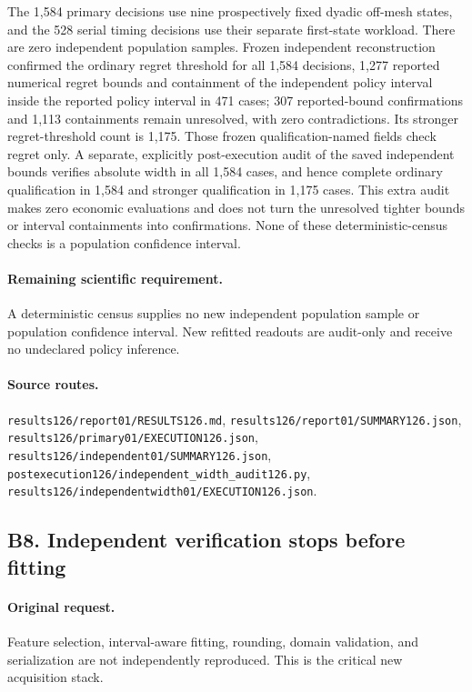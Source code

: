 The 1,584 primary decisions use nine prospectively fixed dyadic off-mesh states, and the 528 serial timing decisions use their separate first-state workload. There are zero independent population samples. Frozen independent reconstruction confirmed the ordinary regret threshold for all 1,584 decisions, 1,277 reported numerical regret bounds and containment of the independent policy interval inside the reported policy interval in 471 cases; 307 reported-bound confirmations and 1,113 containments remain unresolved, with zero contradictions. Its stronger regret-threshold count is 1,175. Those frozen qualification-named fields check regret only. A separate, explicitly post-execution audit of the saved independent bounds verifies absolute width in all 1,584 cases, and hence complete ordinary qualification in 1,584 and stronger qualification in 1,175 cases. This extra audit makes zero economic evaluations and does not turn the unresolved tighter bounds or interval containments into confirmations. None of these deterministic-census checks is a population confidence interval.\par

\paragraph{Remaining scientific requirement.} A deterministic census supplies no new independent population sample or population confidence interval. New refitted readouts are audit-only and receive no undeclared policy inference.

\paragraph{Source routes.} \nolinkurl{results126/report01/RESULTS126.md}, \nolinkurl{results126/report01/SUMMARY126.json}, \nolinkurl{results126/primary01/EXECUTION126.json}, \nolinkurl{results126/independent01/SUMMARY126.json}, \nolinkurl{postexecution126/independent_width_audit126.py}, \nolinkurl{results126/independentwidth01/EXECUTION126.json}.

\subsection*{B8. Independent verification stops before fitting}
\paragraph{Original request.} Feature selection, interval-aware fitting, rounding, domain validation, and serialization are not independently reproduced. This is the critical new acquisition stack.

